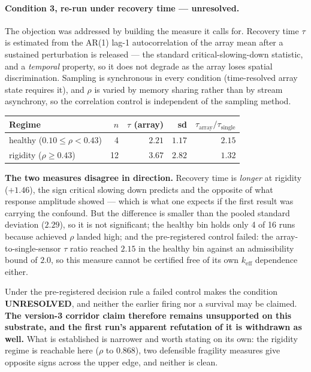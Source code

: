 \documentclass[11pt,a4paper]{article}
\theoremstyle{definition}
\theoremstyle{remark}
\newcommand{\keff}{k_{\text{eff}}}
\begin{document}
\paragraph{Condition 3, re-run under recovery time --- unresolved.}
The objection was addressed by building the measure it calls for. Recovery time $\tau$ is
estimated from the AR(1) lag-1 autocorrelation of the array mean after a sustained perturbation
is released --- the standard critical-slowing-down statistic, and a \emph{temporal} property, so
it does not degrade as the array loses spatial discrimination. Sampling is synchronous in every
condition (time-resolved array state requires it), and $\rho$ is varied by memory sharing rather
than by stream asynchrony, so the correlation control is independent of the sampling method.

\begin{center}
\begin{tabular}{lrrrr}
\toprule
Regime & $n$ & $\tau$ (array) & sd & $\tau_{\text{array}}/\tau_{\text{single}}$ \\
\midrule
healthy ($0.10 \leq \rho < 0.43$) & 4 & $2.21$ & $1.17$ & $2.15$ \\
rigidity ($\rho \geq 0.43$) & 12 & $3.67$ & $2.82$ & $1.32$ \\
\bottomrule
\end{tabular}
\end{center}

\textbf{The two measures disagree in direction.} Recovery time is \emph{longer} at rigidity
($+1.46$), the sign critical slowing down predicts and the opposite of what response amplitude
showed --- which is what one expects if the first result was carrying the confound. But the
difference is smaller than the pooled standard deviation ($2.29$), so it is not significant; the
healthy bin holds only 4 of 16 runs because achieved $\rho$ landed high; and the pre-registered
control failed: the array-to-single-sensor $\tau$ ratio reached $2.15$ in the healthy bin
against an admissibility bound of $2.0$, so this measure cannot be certified free of its own
$\keff$ dependence either.

Under the pre-registered decision rule a failed control makes the condition
\textbf{UNRESOLVED}, and neither the earlier firing nor a survival may be claimed.
\textbf{The version-3 corridor claim therefore remains unsupported on this substrate, and the
first run's apparent refutation of it is withdrawn as well.} What is established is narrower and
worth stating on its own: the rigidity regime is reachable here ($\rho$ to $0.868$), two
defensible fragility measures give opposite signs across the upper edge, and neither is clean.
\end{document}
